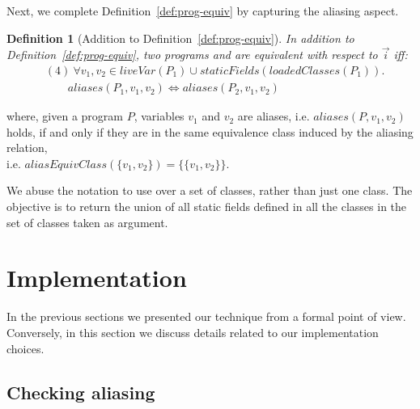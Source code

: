 \documentclass[10pt,conference]{IEEEtran}
\newtheorem{definition}{Definition}
\begin{document}
Next, we complete Definition~\ref{def:prog-equiv} by capturing the aliasing aspect.

\begin{definition}[Addition to Definition~\ref{def:prog-equiv}]\label{def:prog-equiv-add}
   In addition to Definition~\ref{def:prog-equiv},
  two programs  and  are equivalent
  with respect to $\vec{i}$ iff:
\[
    \begin{aligned}
      & (4)~ \forall v_1,v_2 \in \mathit{liveVar}(P_1) \cup \mathit{staticFields}(loadedClasses(P_1)). \\
      & \qquad aliases(P_1, v_1, v_2) \Longleftrightarrow  aliases(P_2, v_1,v_2)      
    \end{aligned}
    \]
   
  \end{definition}

where, given a program $P$, variables $v_1$ and $v_2$ are aliases, i.e. $aliases(P, v_1, v_2)$ holds,
if and only if they are in the same equivalence class induced by the aliasing relation,\\
  i.e. $aliasEquivClass(\{v_1,v_2\}) = \{\{v_1,v_2\}\}$.

  We abuse the notation to use  over a set of classes, rather than just one class.
  The objective is to return the union of all static fields defined in all the classes in the set of classes taken as argument.
  


  \section{Implementation} \label{sec:implementation}

  In the previous sections we presented our technique from a formal point of view.
  Conversely, in this section we discuss details related to our implementation choices.  



\subsection{Checking aliasing}
\end{document}
